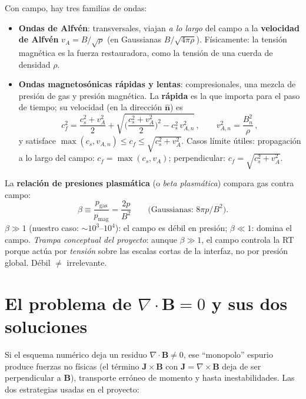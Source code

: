 \documentclass[11pt,a4paper]{article}
\newcommand{\B}{\mathbf{B}}
\newcommand{\term}[1]{\textbf{#1}}
\begin{document}
Con campo, hay tres familias de ondas:
\begin{itemize}[nosep]
  \item \term{Ondas de Alfvén}: transversales, viajan \emph{a lo largo} del campo a la
  \term{velocidad de Alfvén} $v_A=B/\sqrt{\rho}$ (en Gaussianas $B/\sqrt{4\pi\rho}$).
  Físicamente: la tensión magnética es la fuerza restauradora, como la tensión de una
  cuerda de densidad $\rho$.
  \item \term{Ondas magnetosónicas rápidas y lentas}: compresionales, una mezcla de
  presión de gas y presión magnética. La \term{rápida} es la que importa para el paso de
  tiempo; su velocidad (en la dirección $\hat{\mathbf{n}}$) es
  \begin{equation}
  c_f^2=\frac{c_s^2+v_A^2}{2}
  +\sqrt{\Big(\frac{c_s^2+v_A^2}{2}\Big)^2 - c_s^2\,v_{A,n}^2}\,,
  \qquad v_{A,n}^2=\frac{B_n^2}{\rho}\,,
  \end{equation}
  y satisface $\max(c_s, v_{A,n})\le c_f\le\sqrt{c_s^2+v_A^2}$. Casos límite útiles:
  propagación a lo largo del campo: $c_f=\max(c_s,v_A)$; perpendicular: $c_f=\sqrt{c_s^2+v_A^2}$.
\end{itemize}

La \term{relación de presiones plasmática} (o \emph{beta plasmática}) compara gas contra
campo:
\begin{equation}
\beta \equiv \frac{p_\mathrm{gas}}{p_\mathrm{mag}} = \frac{2p}{B^2}
\qquad\text{(Gaussianas: } 8\pi p/B^2\text{)}.
\end{equation}
$\beta\gg1$ (nuestro caso: $\sim10^3$--$10^4$): el campo es débil en presión; $\beta\ll1$:
domina el campo. \emph{Trampa conceptual del proyecto}: aunque $\beta\gg1$, el campo controla
la RT porque actúa por \emph{tensión} sobre las escalas cortas de la interfaz, no por
presión global. Débil $\neq$ irrelevante.

\section{El problema de $\nabla\cdot\B=0$ y sus dos soluciones}
\label{sec:divb}

Si el esquema numérico deja un residuo $\nabla\cdot\B\neq0$, ese ``monopolo'' espurio
produce fuerzas no físicas (el término $\mathbf{J}\times\B$ con $\mathbf{J}=\nabla\times\B$
deja de ser perpendicular a $\B$), transporte erróneo de momento y hasta inestabilidades.
Las dos estrategias usadas en el proyecto:
\end{document}
